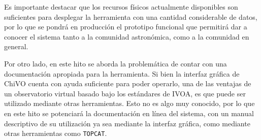 Es importante destacar que los recursos físicos actualmente disponibles son suficientes para desplegar la herramienta con una cantidad considerable de datos, por lo que se pondrá en producción el prototipo funcional que permitirá dar a conocer el sistema tanto a la comunidad astronómica, como a la comunidad en general. 

Por otro lado, en este hito se aborda la problemática de contar con una documentación apropiada para la herramienta. Si bien la interfaz gráfica de ChiVO cuenta con ayuda suficiente para poder operarlo, una de las ventajas de un observatorio virtual basado bajo los estándares de IVOA, es que puede ser utilizado mediante otras herramientas. Esto no es algo muy conocido, por lo que en este hito se potenciará la documentación en línea del sistema, con un manual descriptivo de su utilización ya sea mediante la interfaz gráfica, como mediante otras herramientas como \texttt{TOPCAT}\footnotemark.

